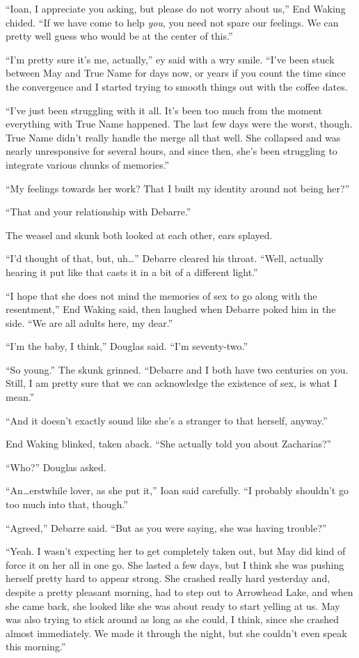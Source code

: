 ``Ioan, I appreciate you asking, but please do not worry about us,'' End Waking chided. ``If we have come to help \emph{you}, you need not spare our feelings. We can pretty well guess who would be at the center of this.''

``I'm pretty sure it's me, actually,'' ey said with a wry smile. ``I've been stuck between May and True Name for days now, or years if you count the time since the convergence and I started trying to smooth things out with the coffee dates.

``I've just been struggling with it all. It's been too much from the moment everything with True Name happened. The last few days were the worst, though. True Name didn't really handle the merge all that well. She collapsed and was nearly unresponsive for several hours, and since then, she's been struggling to integrate various chunks of memories.''

``My feelings towards her work? That I built my identity around not being her?''

``That and your relationship with Debarre.''

The weasel and skunk both looked at each other, ears splayed.

``I'd thought of that, but, uh\ldots{}'' Debarre cleared his throat. ``Well, actually hearing it put like that casts it in a bit of a different light.''

``I hope that she does not mind the memories of sex to go along with the resentment,'' End Waking said, then laughed when Debarre poked him in the side. ``We are all adults here, my dear.''

``I'm the baby, I think,'' Douglas said. ``I'm seventy-two.''

``So young.'' The skunk grinned. ``Debarre and I both have two centuries on you. Still, I am pretty sure that we can acknowledge the existence of sex, is what I mean.''

``And it doesn't exactly sound like she's a stranger to that herself, anyway.''

End Waking blinked, taken aback. ``She actually told you about Zacharias?''

``Who?'' Douglas asked.

``An\ldots erstwhile lover, as she put it,'' Ioan said carefully. ``I probably shouldn't go too much into that, though.''

``Agreed,'' Debarre said. ``But as you were saying, she was having trouble?''

``Yeah. I wasn't expecting her to get completely taken out, but May did kind of force it on her all in one go. She lasted a few days, but I think she was pushing herself pretty hard to appear strong. She crashed really hard yesterday and, despite a pretty pleasant morning, had to step out to Arrowhead Lake, and when she came back, she looked like she was about ready to start yelling at us. May was also trying to stick around as long as she could, I think, since she crashed almost immediately. We made it through the night, but she couldn't even speak this morning.''

